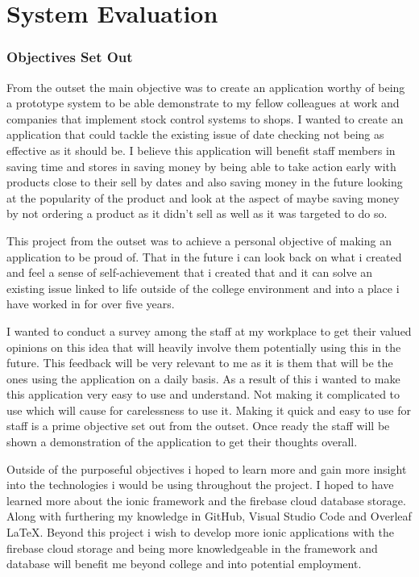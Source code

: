 \chapter{System Evaluation}

\subsection{Objectives Set Out}
From the outset the main objective was to create an application worthy of being a prototype system to be able demonstrate to my fellow colleagues at work and companies that implement stock control systems to shops. I wanted to create an application that could tackle the existing issue of date checking not being as effective as it should be. I believe this application will benefit staff members in saving time and stores in saving money by being able to take action early with products close to their sell by dates and also saving money in the future looking at the popularity of the product and look at the aspect of maybe saving money by not ordering a product as it didn't sell as well as it was targeted to do so.
\newline

This project from the outset was to achieve a personal objective of making an application to be proud of. That in the future i can look back on what i created and feel a sense of self-achievement that i created that and it can solve an existing issue linked to life outside of the college environment and into a place i have worked in for over five years. 
\newline

I wanted to conduct a survey among the staff at my workplace to get their valued opinions on this idea that will heavily involve them potentially using this in the future. This feedback will be very relevant to me as it is them that will be the ones using the application on a daily basis. As a result of this i wanted to make this application very easy to use and understand. Not making it complicated to use which will cause for carelessness to use it. Making it quick and easy to use for staff is a prime objective set out from the outset. Once ready the staff will be shown a demonstration of the application to get their thoughts overall.
\newline

Outside of the purposeful objectives i hoped to learn more and gain more insight into the technologies i would be using throughout the project. I hoped to have learned more about the ionic framework and the firebase cloud database storage. Along with furthering my knowledge in GitHub, Visual Studio Code and Overleaf LaTeX. Beyond this project i wish to develop more ionic applications with the firebase cloud storage and being more knowledgeable in the framework and database will benefit me beyond college and into potential employment.  

